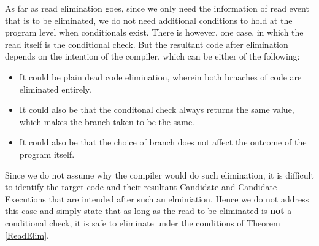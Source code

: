     As far as read elimination goes, since we only need the information of read event that is to be eliminated, we do not need additional conditions to hold at the program level when conditionals exist. 
    There is however, one case, in which the read itself is the conditional check. 
    But the resultant code after elimination depends on the intention of the compiler, which can be either of the following:
    \begin{itemize}
        \item It could be plain dead code elimination, wherein both brnaches of code are eliminated entirely. 
        \item It could also be that the conditonal check always returns the same value, which makes the branch taken to be the same. 
        \item It could also be that the choice of branch does not affect the outcome of the program itself. 
    \end{itemize}
    
    Since we do not assume why the compiler would do such elimination, it is difficult to identify the target code and their resultant Candidate and Candidate Executions that are intended after such an elminiation. 
    Hence we do not address this case and simply state that as long as the read to be eliminated is \textbf{not} a conditional check, it is safe to eliminate under the conditions of Theorem \ref{ReadElim}. 
    